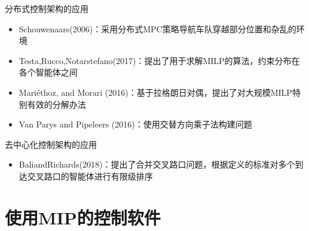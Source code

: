 \documentclass[notheorems,11pt]{beamer}
\theoremstyle{plain}
\numberwithin{theorem}{section}
\numberwithin{lemma}{section}
\numberwithin{corollary}{section}
\theoremstyle{example}
\begin{document}
\begin{frame}{分布式控制架构的应用}
  \begin{itemize}
    \item Schouwenaars(2006)：采用分布式MPC策略导航车队穿越部分位置和杂乱的环境
    \item Testa,Rucco,Notarstefano(2017)：提出了用于求解MILP的算法，约束分布在各个智能体之间
    \item Mariéthoz, and Morari (2016)：基于拉格朗日对偶，提出了对大规模MILP特别有效的分解办法
    \item Van Parys and Pipeleers (2016)：使用交替方向乘子法构建问题
  \end{itemize}
\end{frame}

\begin{frame}{去中心化控制架构的应用}
  \begin{itemize}
    \item BaliandRichards(2018)：提出了合并交叉路口问题，根据定义的标准对多个到达交叉路口的智能体进行有限级排序
  \end{itemize}
\end{frame}





\section{使用MIP的控制软件}
\end{document}
